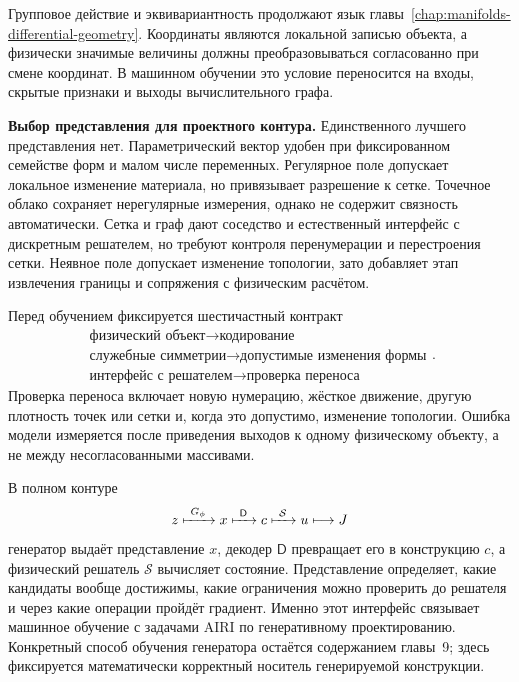\begin{connection}
Групповое действие и эквивариантность продолжают язык главы~\ref{chap:manifolds-differential-geometry}. Координаты являются локальной записью объекта, а физически значимые величины должны преобразовываться согласованно при смене координат. В машинном обучении это условие переносится на входы, скрытые признаки и выходы вычислительного графа.
\end{connection}

\medskip
\noindent\textbf{Выбор представления для проектного контура.}
Единственного лучшего представления нет. Параметрический вектор удобен при фиксированном семействе форм и малом числе переменных. Регулярное поле допускает локальное изменение материала, но привязывает разрешение к сетке. Точечное облако сохраняет нерегулярные измерения, однако не содержит связность автоматически. Сетка и граф дают соседство и естественный интерфейс с дискретным решателем, но требуют контроля перенумерации и перестроения сетки. Неявное поле допускает изменение топологии, зато добавляет этап извлечения границы и сопряжения с физическим расчётом.

Перед обучением фиксируется шестичастный контракт
\begin{equation}
 \boxed{
 \begin{gathered}
 \text{физический объект}
 \to
 \text{кодирование}
 \\
 \text{служебные симметрии}
 \to
 \text{допустимые изменения формы}
 \\
 \text{интерфейс с решателем}
 \to
 \text{проверка переноса}
 \end{gathered}
 }.
\end{equation}
Проверка переноса включает новую нумерацию, жёсткое движение, другую плотность точек или сетки и, когда это допустимо, изменение топологии. Ошибка модели измеряется после приведения выходов к одному физическому объекту, а не между несогласованными массивами.

\begin{connection}
В полном контуре
\begin{equation}
 z
 \xmapsto{\ G_\phi\ }
 x
 \xmapsto{\ \mathsf D\ }
 c
 \xmapsto{\ \mathcal S\ }
 u
 \longmapsto
 J
\end{equation}
генератор выдаёт представление $x$, декодер $\mathsf D$ превращает его в конструкцию $c$, а физический решатель $\mathcal S$ вычисляет состояние. Представление определяет, какие кандидаты вообще достижимы, какие ограничения можно проверить до решателя и через какие операции пройдёт градиент. Именно этот интерфейс связывает машинное обучение с задачами AIRI по генеративному проектированию. Конкретный способ обучения генератора остаётся содержанием главы~9; здесь фиксируется математически корректный носитель генерируемой конструкции.
\end{connection}

